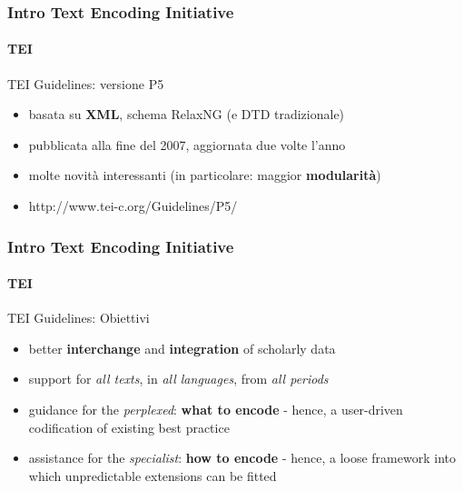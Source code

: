 


    

\begin{frame}
	\frametitle{Intro Text Encoding Initiative}
	\framesubtitle{TEI}
	\addtocounter{nframe}{1}

	\begin{block}{TEI Guidelines: versione P5}
		\begin{itemize}
			\item basata su \textbf{XML}, schema RelaxNG (e DTD tradizionale)
			\item pubblicata alla fine del 2007, aggiornata due volte l’anno
			\item molte novità interessanti (in particolare: maggior \textbf{modularità})
			\item  http://www.tei-c.org/Guidelines/P5/
		\end{itemize}
	\end{block}

\end{frame}

\begin{frame}
	\frametitle{Intro Text Encoding Initiative}
	\framesubtitle{TEI}
	\addtocounter{nframe}{1}

	\begin{block}{TEI Guidelines: Obiettivi}
		\begin{itemize}
			\item better \textbf{interchange} and \textbf{integration} of scholarly data
			\item support for \textit{all texts}, in \textit{all languages}, from \textit{all periods}
			\item guidance for the \textit{perplexed}: \textbf{what to encode} - hence, a user-driven codification of existing best practice
			\item assistance for the \textit{specialist}: \textbf{how to encode} - hence, a loose framework into which unpredictable extensions can be fitted
		\end{itemize}
	\end{block}

\end{frame}



